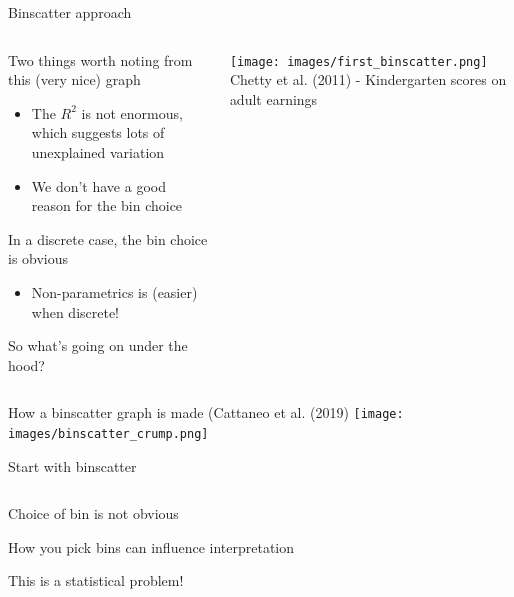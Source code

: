 \documentclass[notes,11pt, aspectratio=169]{beamer}
\newcommand\1{\operatorname{\mathbbm{1}}\indicatorfence}
\newenvironment{wideitemize}{\itemize\addtolength{\itemsep}{10pt}}{\enditemize}
\begin{document}
\begin{frame}{Binscatter approach}
  \begin{columns}[T] %
    \begin{column}{.5\textwidth}
      \begin{wideitemize}
      \item Two things worth noting from this (very nice) graph
        \begin{itemize}
        \item The $R^2$ is not enormous, which suggests lots of unexplained variation
        \item We don't have a good reason for the bin choice
        \end{itemize}
      \item In a discrete case, the bin choice is obvious
        \begin{itemize}
        \item Non-parametrics is (easier) when discrete!
        \end{itemize}
      \item So what's going on under the hood?
  \end{wideitemize}
  \end{column}%
  \hfill%
  \begin{column}{.5\textwidth}
\texttt{[image: images/first\_binscatter.png]}
Chetty et al. (2011) - Kindergarten scores on adult earnings
  \end{column}
\end{columns}
\end{frame}

\begin{frame}{How a binscatter graph is made (Cattaneo et al. (2019)}
  \texttt{[image: images/binscatter\_crump.png]}
\end{frame}


\begin{frame}{Start with binscatter}
  \begin{columns}[T] %
    \begin{column}{.5\textwidth}
      \begin{wideitemize}
      \item<1-> Choice of bin is not obvious
      \item<1-> How you pick bins can influence interpretation
      \item<3-> This is a statistical problem! 
  \end{wideitemize}
  \end{column}%
  \hfill%
  \begin{column}{.5\textwidth}
  \end{column}
\end{columns}
\end{frame}
\end{document}
